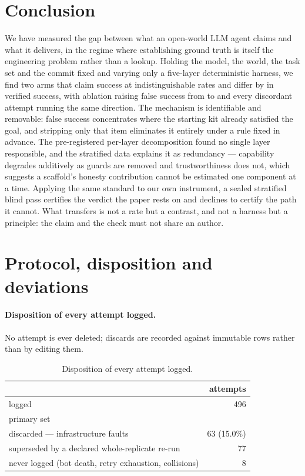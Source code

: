 \documentclass[11pt]{article}
\newcommand{\runin}[1]{\paragraph{#1}}
\begin{document}
\section{Conclusion}
\label{sec:concl}

We have measured the gap between what an open-world LLM agent claims and
what it delivers, in the regime where establishing ground truth is
itself the engineering problem rather than a lookup. Holding the model,
the world, the task set and the commit fixed and varying only a
five-layer deterministic harness, we find two arms that claim success at
indistinguishable rates and differ by \SuccDiff{} in verified success,
with ablation raising false success from \OnFC{} to \OffFC{} and every
discordant attempt running the same direction. The mechanism is
identifiable and removable: false success concentrates where the
starting kit already satisfied the goal, and stripping only that item
eliminates it entirely under a rule fixed in advance. The pre-registered
per-layer decomposition found no single layer responsible, and the
stratified data explains it as redundancy --- capability degrades
additively as guards are removed and trustworthiness does not, which
suggests a scaffold's honesty contribution cannot be estimated one
component at a time. Applying the same standard to our own instrument, a
sealed stratified blind pass certifies the verdict the paper rests on
and declines to certify the path it cannot. What transfers is not a rate
but a contrast, and not a harness but a principle: the claim and the
check must not share an author.




\clearpage
\appendix
\section{Protocol, disposition and deviations}
\label{app:protocol}

\runin{Disposition of every attempt logged.}
No attempt is ever deleted; discards are recorded against immutable rows
rather than by editing them.

\begin{table}[h]
\centering\small
\begin{tabular}{@{}lr@{}}
\toprule
 & attempts\\
\midrule
logged                                                    & 496\\
primary set                                               & \NPrimary{}\\
discarded --- infrastructure faults                       & 63 (15.0\%)\\
superseded by a declared whole-replicate re-run           & 77\\
never logged (bot death, retry exhaustion, collisions)    & 8\\
\bottomrule
\end{tabular}
\caption{Disposition of every attempt logged.}
\label{tab:disposition}
\end{table}
\end{document}
